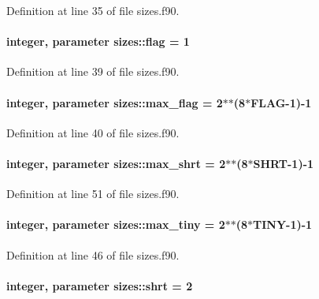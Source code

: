 Definition at line 35 of file sizes.\-f90.

\hypertarget{classsizes_a424174c724585fa743040b8cc6c0d22a}{
\paragraph[{flag}]{\setlength{\rightskip}{0pt plus 5cm}integer, parameter sizes\-::flag = 1}}\label{classsizes_a424174c724585fa743040b8cc6c0d22a}


Definition at line 39 of file sizes.\-f90.

\hypertarget{classsizes_af1d01281c6760fff5e424262eb603d74}{
\paragraph[{max\-\_\-flag}]{\setlength{\rightskip}{0pt plus 5cm}integer, parameter sizes\-::max\-\_\-flag = 2$\ast$$\ast$(8$\ast$F\-L\-A\-G-\/1)-\/1}}\label{classsizes_af1d01281c6760fff5e424262eb603d74}


Definition at line 40 of file sizes.\-f90.

\hypertarget{classsizes_af8f94289a78904a42ae6075afc3943ca}{
\paragraph[{max\-\_\-shrt}]{\setlength{\rightskip}{0pt plus 5cm}integer, parameter sizes\-::max\-\_\-shrt = 2$\ast$$\ast$(8$\ast$S\-H\-R\-T-\/1)-\/1}}\label{classsizes_af8f94289a78904a42ae6075afc3943ca}


Definition at line 51 of file sizes.\-f90.

\hypertarget{classsizes_a04d73151c62e83015b458f2ae0646964}{
\paragraph[{max\-\_\-tiny}]{\setlength{\rightskip}{0pt plus 5cm}integer, parameter sizes\-::max\-\_\-tiny = 2$\ast$$\ast$(8$\ast$T\-I\-N\-Y-\/1)-\/1}}\label{classsizes_a04d73151c62e83015b458f2ae0646964}


Definition at line 46 of file sizes.\-f90.

\hypertarget{classsizes_a9fe4a96f9e9e8b6ff57d48364a829454}{
\paragraph[{shrt}]{\setlength{\rightskip}{0pt plus 5cm}integer, parameter sizes\-::shrt = 2}}\label{classsizes_a9fe4a96f9e9e8b6ff57d48364a829454}


